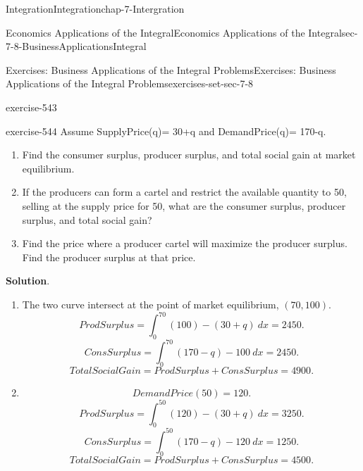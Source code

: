 \documentclass[oneside,10pt,]{book}
\numberwithin{equation}{section}
\begin{document}
\begin{chapterptx}{Integration}{}{Integration}{}{}{chap-7-Intergration}
\begin{sectionptx}{Economics Applications of the Integral}{}{Economics Applications of the Integral}{}{}{sec-7-8-BusinessApplicationsIntegral}
\begin{exercises-subsection-numberless}{Exercises: Business Applications of the Integral Problems}{}{Exercises: Business Applications of the Integral Problems}{}{}{exercises-set-sec-7-8}
\begin{divisionexercise}{6}{}{}{exercise-543}
\begin{equation*}
\end{equation*}
\end{divisionexercise}%
\begin{divisionexercise}{7}{}{}{exercise-544}%
\hypertarget{p-3136}{}%
Assume SupplyPrice(q)= 30+q and DemandPrice(q)= 170-q.%
\leavevmode%
\begin{enumerate}[label=(\alph*)]
\item\hypertarget{li-799}{}\hypertarget{p-3137}{}%
Find the consumer surplus, producer surplus, and total social gain at market equilibrium.%
\item\hypertarget{li-800}{}\hypertarget{p-3138}{}%
If the producers can form a cartel and restrict the available quantity to 50, selling at the supply price for 50, what are the consumer surplus, producer surplus, and total social gain?%
\item\hypertarget{li-801}{}\hypertarget{p-3139}{}%
Find the price where a producer cartel will maximize the producer surplus.  Find the producer surplus at that price.%
\end{enumerate}
\par\smallskip%
\noindent\textbf{Solution}.\hypertarget{solution-275}{}\quad%
\leavevmode%
\begin{enumerate}[label=(\alph*)]
\item\hypertarget{li-802}{}\hypertarget{p-3140}{}%
The two curve intersect at the point of market equilibrium, \((70, 100)\).%
%
\begin{equation*}
ProdSurplus=
\int_0^{70}
(100)-
(30+q)\ dx=2450.
\end{equation*}
%
\begin{equation*}
ConsSurplus=
\int_0^{70}
(170-q)-100\ dx=2450.
\end{equation*}
%
\begin{equation*}
TotalSocialGain=ProdSurplus+ConsSurplus=4900.
\end{equation*}
\item\hypertarget{li-803}{}%
\begin{equation*}
DemandPrice(50)=120.
\end{equation*}
%
\begin{equation*}
ProdSurplus=
\int_0^{50}
(120)-
(30+q)\ dx=3250.
\end{equation*}
%
\begin{equation*}
ConsSurplus=
\int_0^{50}
(170-q)-120\ dx=1250.
\end{equation*}
%
\begin{equation*}
TotalSocialGain=ProdSurplus+ConsSurplus=4500.
\end{equation*}

\end{enumerate}
\end{divisionexercise}
\end{exercises-subsection-numberless}
\end{sectionptx}
\end{chapterptx}
\end{document}
